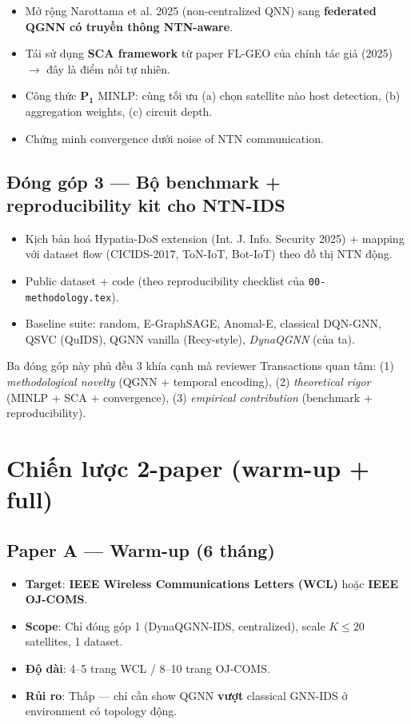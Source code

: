 \documentclass[11pt,a4paper]{article}
\begin{document}
\begin{itemize}
  \item Mở rộng Narottama et al. 2025 (non-centralized QNN) sang \textbf{federated QGNN có truyền thông NTN-aware}.
  \item Tái sử dụng \textbf{SCA framework} từ paper FL-GEO của chính tác giả (2025) $\rightarrow$ đây là điểm nối tự nhiên.
  \item Công thức $\mathbf{P_1}$ MINLP: cùng tối ưu (a) chọn satellite nào host detection, (b) aggregation weights, (c) circuit depth.
  \item Chứng minh convergence dưới noise of NTN communication.
\end{itemize}

\subsection{Đóng góp 3 --- Bộ benchmark + reproducibility kit cho NTN-IDS}

\begin{itemize}
  \item Kịch bản hoá Hypatia-DoS extension (Int. J. Info. Security 2025) + mapping với dataset flow (CICIDS-2017, ToN-IoT, Bot-IoT) theo đồ thị NTN động.
  \item Public dataset + code (theo reproducibility checklist của \texttt{00-methodology.tex}).
  \item Baseline suite: random, E-GraphSAGE, Anomal-E, classical DQN-GNN, QSVC (QuIDS), QGNN vanilla (Recy-style), \textit{DynaQGNN} (của ta).
\end{itemize}

\begin{greenbox}
Ba đóng góp này phủ đều 3 khía cạnh mà reviewer Transactions quan tâm:
(1) \textit{methodological novelty} (QGNN + temporal encoding),
(2) \textit{theoretical rigor} (MINLP + SCA + convergence),
(3) \textit{empirical contribution} (benchmark + reproducibility).
\end{greenbox}

\section{Chiến lược 2-paper (warm-up + full)}

\subsection{Paper A --- Warm-up (6 tháng)}
\begin{itemize}
  \item \textbf{Target}: \textbf{IEEE Wireless Communications Letters (WCL)} hoặc \textbf{IEEE OJ-COMS}.
  \item \textbf{Scope}: Chỉ đóng góp 1 (DynaQGNN-IDS, centralized), scale $K \leq 20$ satellites, 1 dataset.
  \item \textbf{Độ dài}: 4--5 trang WCL / 8--10 trang OJ-COMS.
  \item \textbf{Rủi ro}: Thấp --- chỉ cần show QGNN \textbf{vượt} classical GNN-IDS ở environment có topology động.
\end{itemize}
\end{document}
